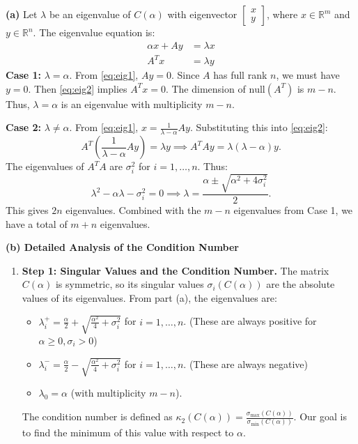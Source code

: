 \begin{solution}
\textbf{(a)} Let $\lambda$ be an eigenvalue of $C(\alpha)$ with eigenvector $\begin{bmatrix} x \\ y \end{bmatrix}$, where $x \in \mathbb{R}^m$ and $y \in \mathbb{R}^n$. The eigenvalue equation is:
\begin{align}
    \alpha x + Ay &= \lambda x \label{eq:eig1} \\
    A^T x &= \lambda y \label{eq:eig2}
\end{align}
\textbf{Case 1:} $\lambda = \alpha$. From \eqref{eq:eig1}, $Ay = 0$. Since $A$ has full rank $n$, we must have $y=0$. Then \eqref{eq:eig2} implies $A^T x = 0$. The dimension of $\text{null}(A^T)$ is $m-n$. Thus, $\lambda = \alpha$ is an eigenvalue with multiplicity $m-n$.

\textbf{Case 2:} $\lambda \neq \alpha$. From \eqref{eq:eig1}, $x = \frac{1}{\lambda - \alpha} Ay$. Substituting this into \eqref{eq:eig2}:
\[
A^T \left( \frac{1}{\lambda - \alpha} Ay \right) = \lambda y \implies A^T A y = \lambda(\lambda - \alpha) y.
\]
The eigenvalues of $A^T A$ are $\sigma_i^2$ for $i=1, \dots, n$. Thus:
\[
\lambda^2 - \alpha \lambda - \sigma_i^2 = 0 \implies \lambda = \frac{\alpha \pm \sqrt{\alpha^2 + 4\sigma_i^2}}{2}.
\]
This gives $2n$ eigenvalues. Combined with the $m-n$ eigenvalues from Case 1, we have a total of $m+n$ eigenvalues.

\textbf{(b) Detailed Analysis of the Condition Number}

\begin{enumerate}
    \item \textbf{Step 1: Singular Values and the Condition Number.}
    The matrix $C(\alpha)$ is symmetric, so its singular values $\sigma_i(C(\alpha))$ are the absolute values of its eigenvalues. From part (a), the eigenvalues are:
    \begin{itemize}
        \item $\lambda_i^{+} = \frac{\alpha}{2} + \sqrt{\frac{\alpha^2}{4} + \sigma_i^2}$ for $i=1, \dots, n$. (These are always positive for $\alpha \ge 0, \sigma_i > 0$)
        \item $\lambda_i^{-} = \frac{\alpha}{2} - \sqrt{\frac{\alpha^2}{4} + \sigma_i^2}$ for $i=1, \dots, n$. (These are always negative)
        \item $\lambda_0 = \alpha$ (with multiplicity $m-n$).
    \end{itemize}
    The condition number is defined as $\kappa_2(C(\alpha)) = \frac{\sigma_{\max}(C(\alpha))}{\sigma_{\min}(C(\alpha))}$. Our goal is to find the minimum of this value with respect to $\alpha$.


\end{enumerate}
\end{solution}
